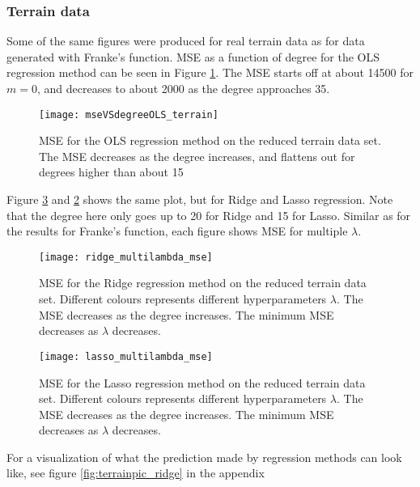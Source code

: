 \subsubsection{Terrain data}
Some of the same figures were produced for real terrain data as for data generated with Franke's function. MSE as a function of degree for the OLS regression method can be seen in Figure \ref{fig:mseVSdegreeOLSterrain}. The MSE starts off at about 14500 for $m=0$, and decreases to about 2000 as the degree approaches 35.
\begin{figure}[htbp]
	\centering
	\texttt{[image: mseVSdegreeOLS\_terrain]}
	\caption{MSE for the OLS regression method on the reduced terrain data set. The MSE decreases as the degree increases, and flattens out for degrees higher than about 15}
	\label{fig:mseVSdegreeOLSterrain}
\end{figure}

Figure \ref{fig:mseVSdegreeRIDGEterrain} and \ref{fig:mseVSdegreeLASSOterrain} shows the same plot, but for Ridge and Lasso regression. Note that the degree here only goes up to 20 for Ridge and 15 for Lasso. Similar as for the results for Franke's function, each figure shows MSE for multiple $\lambda$.

\begin{figure}[htbp]
	\centering
	\texttt{[image: ridge\_multilambda\_mse]}
	\caption{MSE for the Ridge regression method on the reduced terrain data set. Different colours represents different hyperparameters $\lambda$. The MSE decreases as the degree increases. The minimum MSE decreases as $\lambda$ decreases.}
	\label{fig:mseVSdegreeLASSOterrain}
\end{figure}

\begin{figure}[htbp]
	\centering
	\texttt{[image: lasso\_multilambda\_mse]}
	\caption{MSE for the Lasso regression method on the reduced terrain data set. Different colours represents different hyperparameters $\lambda$. The MSE decreases as the degree increases. The minimum MSE decreases as $\lambda$ decreases.}
	\label{fig:mseVSdegreeRIDGEterrain}
\end{figure}

For a visualization of what the prediction made by regression methods can look like, see figure \ref{fig:terrainpic_ridge} in the appendix

\vfill
\newpage
